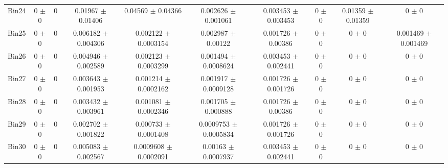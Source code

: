 \begin{tabular}{@{\extracolsep{4pt}}lccccccccc@{}}
     Bin24 & 0 $\pm$ 0 & 0 & 0.01967 $\pm$ 0.01406 & 0.04569 $\pm$ 0.04366 & 0.002626 $\pm$ 0.001061 & 0.003453 $\pm$ 0.003453 & 0 $\pm$ 0 & 0.01359 $\pm$ 0.01359 & 0 $\pm$ 0 \\ 
     Bin25 & 0 $\pm$ 0 & 0 & 0.006182 $\pm$ 0.004306 & 0.002122 $\pm$ 0.0003154 & 0.002987 $\pm$ 0.00122 & 0.001726 $\pm$ 0.00386 & 0 $\pm$ 0 & 0 $\pm$ 0 & 0.001469 $\pm$ 0.001469 \\ 
     Bin26 & 0 $\pm$ 0 & 0 & 0.004946 $\pm$ 0.002589 & 0.002123 $\pm$ 0.0003299 & 0.001494 $\pm$ 0.0008624 & 0.003453 $\pm$ 0.002441 & 0 $\pm$ 0 & 0 $\pm$ 0 & 0 $\pm$ 0 \\ 
     Bin27 & 0 $\pm$ 0 & 0 & 0.003643 $\pm$ 0.001953 & 0.001214 $\pm$ 0.0002162 & 0.001917 $\pm$ 0.0009128 & 0.001726 $\pm$ 0.001726 & 0 $\pm$ 0 & 0 $\pm$ 0 & 0 $\pm$ 0 \\ 
     Bin28 & 0 $\pm$ 0 & 0 & 0.003432 $\pm$ 0.003961 & 0.001081 $\pm$ 0.0002346 & 0.001705 $\pm$ 0.000888 & 0.001726 $\pm$ 0.00386 & 0 $\pm$ 0 & 0 $\pm$ 0 & 0 $\pm$ 0 \\ 
     Bin29 & 0 $\pm$ 0 & 0 & 0.002702 $\pm$ 0.001822 & 0.000733 $\pm$ 0.0001408 & 0.0009753 $\pm$ 0.0005834 & 0.001726 $\pm$ 0.001726 & 0 $\pm$ 0 & 0 $\pm$ 0 & 0 $\pm$ 0 \\ 
     Bin30 & 0 $\pm$ 0 & 0 & 0.005083 $\pm$ 0.002567 & 0.0009608 $\pm$ 0.0002091 & 0.00163 $\pm$ 0.0007937 & 0.003453 $\pm$ 0.002441 & 0 $\pm$ 0 & 0 $\pm$ 0 & 0 $\pm$ 0 \\ 
\hline\hline
  \end{tabular}
